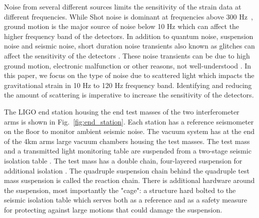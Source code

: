 \documentclass[12pt]{iopart}
\begin{document}
Noise from several different sources limits the sensitivity of the strain data at different frequencies. 
While Shot noise is dominant at frequencies above 300 Hz~\cite{tjthesis}, ground motion is the major source of noise below 10 Hz which can affect the higher frequency band of the detectors. In addition to quantum noise, suspension noise and seismic noise, short duration noise transients also known as glitches can affect the sensitivity of the detectors \cite{transientpaper}. These noise transients can be due to high ground motion, electronic malfunction or other reasons, not well-understood \cite{noisepaper,Cabero_2019}. In this paper, we focus on the type of noise due to scattered light which impacts the gravitational strain in 10 Hz to 120 Hz frequency band.  Identifying and reducing the amount of scattering is imperative to increase the sensitivity of the detectors. 
 
The LIGO end station housing the end test masses \cite{ETM_ref} of the two interferometer arms is shown in Fig.~\ref{fig:end_station}. Each station has a reference seismometer on the floor to monitor ambient seismic noise. The vacuum system has at the end of the 4km arms large vacuum chambers housing the test masses. The test mass and a transmitted light monitoring table are suspended from a two-stage seismic isolation table \cite{Matichard_2015}. The test mass has a double chain, four-layered suspension for additional isolation \cite{Aston_2012}. The quadruple suspension chain behind the quadruple test mass suspension is called the reaction chain. There is additional hardware around the suspension, most importantly the "cage": a structure hard bolted to the seismic isolation table which serves both as a reference and as a safety measure for protecting against large motions that could damage the suspension.
\end{document}
